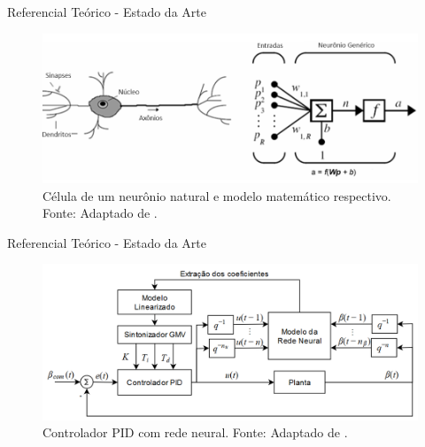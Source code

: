 \documentclass{beamer}
\begin{document}
\begin{frame}{Referencial Teórico - Estado da Arte}
    \begin{figure}[HT]
		\begin{center}
		\captionsetup{justification=centering}
        \includegraphics[scale=.35]{../referencial/img/neuronio_unal_p6}
        \caption{Célula de um neurônio natural e modelo matemático respectivo. \newline
        		 Fonte: Adaptado de  .}
		\label{FIG_ADAPTATIVO}
        \end{center}
	\end{figure}
\end{frame}


\begin{frame}{Referencial Teórico - Estado da Arte}
    \begin{figure}[HT]
		\begin{center}
		\captionsetup{justification=centering}
        \includegraphics[scale=.42]{../referencial/img/pid_neural_chen_p212}
        \caption{Controlador PID com rede neural. \newline
        		 Fonte: Adaptado de .}
		\label{FIG_ADAPTATIVO}
        \end{center}
	\end{figure}
\end{frame}
\end{document}
